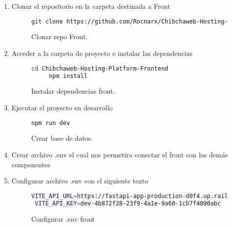 \begin{enumerate}
    \item Clonar el repositorio en la carpeta destinada a Front

    \begin{figure}
    \begin{lstlisting}[language=bash]
git clone https://github.com/Rocnarx/Chibchaweb-Hosting-Platform-Frontend.git
    \end{lstlisting}
    \caption{Clonar repo Front.}
    \label{fig:Clonar-repo-Front}
    \end{figure}
     \item Acceder a la carpeta de proyecto e instalar las dependencias

     \begin{figure}[H]
     \begin{lstlisting}[language=bash]
     cd Chibchaweb-Hosting-Platform-Frontend
     npm install
     \end{lstlisting}
     \caption{Instalar dependencias front.}
     \label{fig:req-front}
     \end{figure}
     \item Ejecutar el proyecto en desarrollo

     \begin{figure}[H]
     \begin{lstlisting}[language=bash]
     npm run dev
     \end{lstlisting}
     \caption{Crear base de datos.}
     \label{fig:create-db}
     \end{figure}

     \item Crear archivo .env el cual nos permetira conectar el front con los demás componentes

     \item Configurar archivo .env con el siguiente texto

     \begin{figure}[H]
     \begin{lstlisting}[language=bash]
 VITE_API_URL=https://fastapi-app-production-d0f4.up.railway.app
 VITE_API_KEY=dev-4b872f28-23f9-4a1e-9a60-1cb7f4090abc
 \end{lstlisting}
 \caption{Configurar .env front}
 \label{fig:config-env-front}
    \end{figure}
\end{enumerate}
